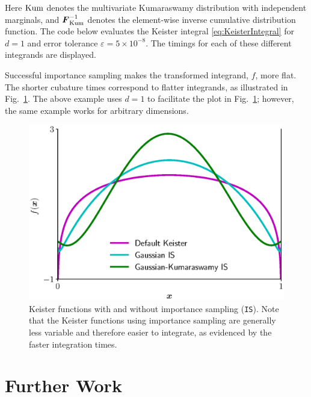 \documentclass[graybox]{svmult}
\begin{document}
Here $\textup{Kum}$ denotes the multivariate Kumaraswamy distribution with independent marginals, and $ \boldsymbol{F}^{-1}_{\textup{Kum}}$ denotes the element-wise inverse cumulative distribution function.  The  code below evaluates the Keister integral \eqref{eq:KeisterIntegral} for $d=1$ and error tolerance $\varepsilon = 5 \times 10^{-8}$.  The timings for each of these different integrands are displayed.



Successful importance sampling makes the transformed integrand, $f$, more flat. The shorter cubature times correspond to flatter integrands, as  illustrated in Fig.~\ref{fig:mIS}. The above example uses $d=1$ to facilitate the plot in 
Fig.~\ref{fig:mIS}; however, the same example works for arbitrary dimensions.
\begin{figure}[t]
    \centering
	\includegraphics[width=.75\textwidth]{QMCSoftwareArticle/vfigs/multiple_IS.eps}
	\caption{Keister functions with and without importance sampling (\texttt{IS}). Note that the Keister functions using importance sampling are generally less variable and therefore easier to integrate, as evidenced by the faster integration times.} \label{fig:mIS}
\end{figure}



\section{Further Work} \label{sec:further}
\end{document}
